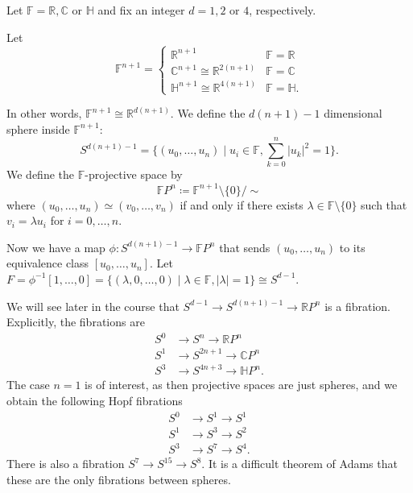 \documentclass[ma3408.tex]{subfiles}
\begin{document}
\begin{Exa}
	Let $\mathbb{F} = \mathbb{R},\mathbb{C}$ or $\mathbb{H}$ and fix an integer $d = 1,2$ or $4$, respectively. 

	Let 
	\[
\mathbb{F}^{n+1} = \begin{cases}
	\mathbb{R}^{n+1} & \mathbb{F} = \mathbb{R} \\
	\mathbb{C}^{n+1} \cong \mathbb{R}^{2(n+1)} & \mathbb{F} = \mathbb{C} \\
	\mathbb{H}^{n+1} \cong \mathbb{R}^{4(n+1)} & \mathbb{F} = \mathbb{H}.
\end{cases}
\]

In other words, $\mathbb{F}^{n+1} \cong \mathbb{R}^{d(n+1)}$. We define the $d(n+1)-1$ dimensional sphere inside $\mathbb{F}^{n+1}$:
\[
S^{d(n+1)-1} = \{ (u_0,\ldots,u_n) \mid u_i \in \mathbb{F}, \sum_{k=0}^n |u_k|^2 = 1 \}.
\]
We define the $\mathbb{F}$-projective space by
\[
\mathbb{F}P^n \coloneqq \mathbb{F}^{n+1} \setminus \{ 0 \} / \sim
\]
where $(u_0,\ldots,u_n) \simeq (v_0,\ldots,v_n)$ if and only if there exists $\lambda \in \mathbb{F} \setminus \{ 0 \}$ such that $v_i = \lambda u_i$ for $i = 0,\ldots,n$. 

Now we have a map $\phi \colon S^{d(n+1)-1} \to \mathbb{F}P^n$ that sends $(u_0,\ldots,u_n)$ to its equivalence class $[u_0,\ldots,u_n]$. Let $F = \phi^{-1}[1,\ldots,0] = \{ (\lambda, 0,\ldots,0) \mid \lambda \in \mathbb{F},|\lambda| = 1 \} \cong S^{d-1}$. 

We will see later in the course that $S^{d-1} \to S^{d(n+1)-1} \to \mathbb{R}P^n$ is a fibration. Explicitly, the fibrations are
\[
\begin{split}
S^0 &\to S^n \to \mathbb{R}P^n \\
S^1 &\to S^{2n+1} \to \mathbb{C}P^n \\
S^3 &\to S^{4n+3} \to \mathbb{H}P^n.
\end{split}
\]
The case $n = 1$ is of interest, as then projective spaces are just spheres, and we obtain the following Hopf fibrations 
\[
\begin{split}
S^0 &\to S^1 \to S^1 \\
S^1 &\to S^{3} \to S^2\\
S^3 &\to S^{7} \to S^4.
\end{split}
\]
There is also a fibration $S^7 \to S^{15} \to S^8$. It is a difficult theorem of Adams that these are the only fibrations between spheres. 
\end{Exa}
\end{document}
